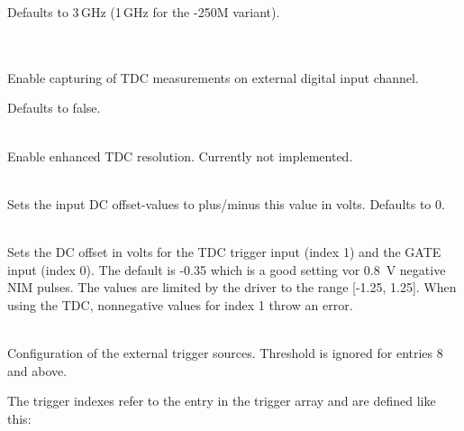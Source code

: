             Defaults to 3\,GHz (1\,GHz for the -250M variant).
            \par

            \\
            \\
            Enable capturing of TDC measurements on external digital input channel.\par
            Defaults to false.\par

            \\
            Enable enhanced TDC resolution. Currently not implemented.\par

            \\
            Sets the input DC offset-values to plus/minus this value in volts. Defaults to 0.\par

            \\
            Sets the DC offset in volts for the TDC trigger input (index 1) and the GATE input (index 0). The default is -0.35 which is a good setting vor \SI{0.8}{\volt} negative NIM pulses.
            The values are limited by the driver to the range [-1.25, 1.25]. When using the TDC, nonnegative values for index 1 throw an error. \par

            \\
            Configuration of the external trigger sources. Threshold is ignored for entries 8 and above.\par

            The trigger indexes refer to the entry in the trigger array and are defined like this:\par

